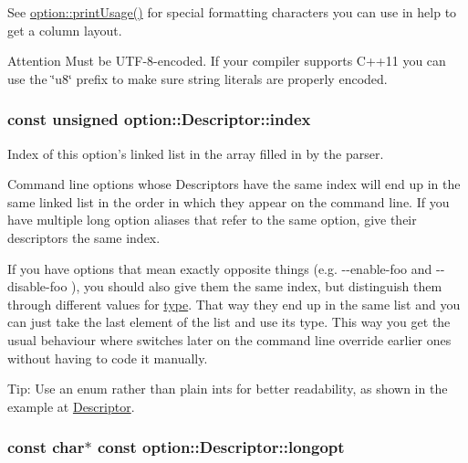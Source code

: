 \-See \hyperlink{namespaceoption_afc8bb7e040a98a0b33ff1ce9da1be0d1}{option\-::print\-Usage()} for special formatting characters you can use in {\ttfamily help} to get a column layout.

\begin{DoxyAttention}{\-Attention}
\-Must be \-U\-T\-F-\/8-\/encoded. \-If your compiler supports \-C++11 you can use the \char`\"{}u8\char`\"{} prefix to make sure string literals are properly encoded. 
\end{DoxyAttention}
\hypertarget{structoption_1_1_descriptor_a1fee8ac44f529c99ac2b1149b4c391b1}{
\subsubsection[{index}]{\setlength{\rightskip}{0pt plus 5cm}const unsigned {\bf option\-::\-Descriptor\-::index}}}\label{structoption_1_1_descriptor_a1fee8ac44f529c99ac2b1149b4c391b1}


\-Index of this option's linked list in the array filled in by the parser. 

\-Command line options whose \-Descriptors have the same index will end up in the same linked list in the order in which they appear on the command line. \-If you have multiple long option aliases that refer to the same option, give their descriptors the same {\ttfamily index}.

\-If you have options that mean exactly opposite things (e.\-g. {\ttfamily -\/-\/enable-\/foo} and {\ttfamily -\/-\/disable-\/foo} ), you should also give them the same {\ttfamily index}, but distinguish them through different values for \hyperlink{structoption_1_1_descriptor_a1b220dabd8aad075fa441a80f9b9343c}{type}. \-That way they end up in the same list and you can just take the last element of the list and use its type. \-This way you get the usual behaviour where switches later on the command line override earlier ones without having to code it manually.

\begin{DoxyParagraph}{\-Tip\-:}
\-Use an enum rather than plain ints for better readability, as shown in the example at \hyperlink{structoption_1_1_descriptor}{\-Descriptor}. 
\end{DoxyParagraph}
\hypertarget{structoption_1_1_descriptor_a470c449dfa894c9bfda2dae026142b4b}{
\subsubsection[{longopt}]{\setlength{\rightskip}{0pt plus 5cm}const char$\ast$ const {\bf option\-::\-Descriptor\-::longopt}}}\label{structoption_1_1_descriptor_a470c449dfa894c9bfda2dae026142b4b}


